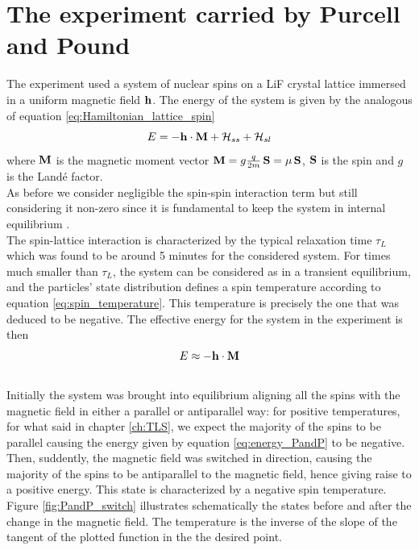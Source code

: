 \section{The experiment carried by Purcell and Pound}
The experiment used a system of nuclear spins on a LiF crystal lattice immersed in a uniform magnetic field $\mathbf{h}$.
The energy of the system is given by the analogous of equation \ref{eq:Hamiltonian_lattice_spin}
\begin{equation*}
    E = - \mathbf{h} \cdot \mathbf{M} + \mathcal{H}_{ss} + \mathcal{H}_{sl}
\end{equation*}
where $\mathbf{M}$ is the magnetic moment vector $\mathbf{M} = g \frac{q}{2m} \, \mathbf{S} = \mu \, \mathbf{S}$, $\mathbf{S}$ is the spin and $g$ is the Landé factor. \\
As before we consider negligible the spin-spin interaction term but still considering it non-zero since it is fundamental to keep the system in internal equilibrium \cite{main_article}. \\
The spin-lattice interaction is characterized by the typical relaxation time $\tau_{L}$ which was found to be around 5 minutes for the considered system. For times much smaller than $\tau_L$, 
the system can be considered as in a transient equilibrium, and the particles' state distribution defines a spin temperature according to equation \ref{eq:spin_temperature}. This temperature is precisely the one
that was deduced to be negative. The effective energy for the system in the experiment is then 
\begin{equation}
    E \approx - \mathbf{h} \cdot \mathbf{M}
    \label{eq:energy_PandP}
\end{equation}\\
Initially the system was brought into equilibrium aligning all the spins with the magnetic field in either a parallel or antiparallel way: for positive temperatures, for what said in chapter \ref{ch:TLS}, we expect the majority of the spins to be parallel causing the energy given by 
equation \ref{eq:energy_PandP} to be negative. \\
Then, suddently, the magnetic field was switched in direction, causing the majority of the spins to be antiparallel to the magnetic field, hence giving raise to a positive energy. This state is characterized by a negative spin temperature.
Figure \ref{fig:PandP_switch} illustrates schematically the states before and after the change in the magnetic field. The temperature is the inverse of the slope of the tangent of the plotted function in the the desired point. \par
